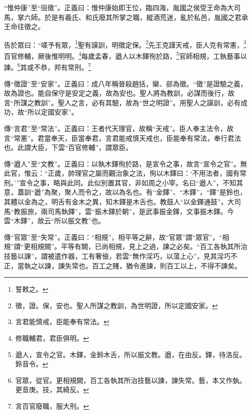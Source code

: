 {\noindent\shu{}\fzkt “惟仲康”至“徂徵”。正義曰：惟仲康始即王位，臨四海，胤國之侯受王命為大司馬，掌六師。於是有羲氏、和氏廢其所掌之職，縱酒荒迷，亂於私邑，胤國之君承王命往徵之。 \par}

告於眾曰：“嗟予有眾，\footnote{誓敕之。}聖有謨訓，明徵定保。\footnote{徵，證。保，安也。聖人所謀之教訓，為世明證，所以定國安家。}先王克謹天戒，臣人克有常憲，\footnote{言君能慎戒，臣能奉有常法。}百官修輔，厥後惟明明。\footnote{修職輔君，君臣俱明。}每歲孟春，遒人以木鐸徇於路，\footnote{遒人，宣令之官。木鐸，金鈴木舌，所以振文教。遒，在由反。鐸，待洛反。鈴音令。}官師相規，工執藝事以諫。\footnote{官眾，從官。更相規闕，百工各執其所治技藝以諫，諫失常。藝，本又作埶。更音庚。技，其綺反。}其或不恭，邦有常刑。\footnote{言百官廢職，服大刑。}

{\noindent\zhuan{}\fzbyks 傳“徵證”至“安家”。正義曰：成八年稱晉殺趙括，欒、郤為徵。“徵”是證驗之義，故為證也。能自保守是安定之義，故為安也。聖人將為教訓，必謀而後行，故言“所謀之教訓”。聖人之言，必有其驗，故為“世之明證”。用聖人之謨訓，必有成功，故“所以定國安家”。 \par}

{\noindent\zhuan{}\fzbyks 傳“言君”至“常法”。正義曰：王者代天理官，故稱“天戒”。臣人奉主法令，故言“常憲”。君當奉天，臣當奉君，言君能戒慎天戒也，臣能奉有常法，奉行君法也。此謂大臣，下雲“百官修輔”，謂眾臣。 \par}

{\noindent\zhuan{}\fzbyks 傳“遒人”至“文教”。正義曰：以執木鐸徇於路，是宣令之事，故言“宣令之官”。無此官，惟云：“正歲，帥理官之屬而觀治象之法，徇以木鐸曰：‘不用法者，國有常刑。’”宣令之事，略與此同。此似別置其官，非如周之小宰。名曰“遒人”，不知其意，蓋訓“遒”為聚，聚人而令之，故以為名也。有“金鐸”、“木鐸”，“鐸”是鈴也，其體以金為之，明舌有金木之異，知木鐸是木舌也。教鼓人“以金鐸通鼓”，大司馬“教振旅，兩司馬執鐸”，雲“振木鐸於朝”，是武事振金鐸，文事振木鐸。今雲“木鐸”，故云“所以振文教”也。 \par}

{\noindent\zhuan{}\fzbyks 傳“官眾”至“失常”。正義曰：“相規”，相平等之辭，故“官眾”謂“眾官”，“相規”謂“更相規闕”。平等有闕，已尚相規，見上之過，諫之必矣。“百工各執其所治技藝以諫”，謂被遣作器，工有奢儉，若雲“無作淫巧，以蕩上心”，見其淫巧不正，當執之以諫，諫失常也。百工之賤，猶令進諫，則百工以上，不得不諫矣。 \par}

